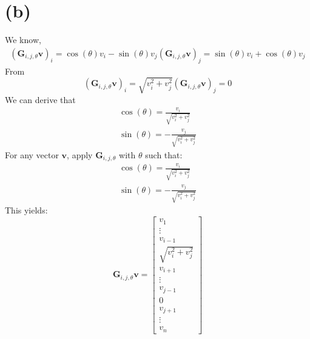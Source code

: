 \documentclass{article}
\begin{document}
\section*{(b)}
We know,
\begin{align*}
    (\bm{G}_{i,j,\theta} \bm{v})_i = \cos(\theta)v_i - \sin(\theta)v_j
    (\bm{G}_{i,j,\theta} \bm{v})_j = \sin(\theta)v_i + \cos(\theta)v_j
\end{align*}
From 
\[
    (\bm{G}_{i,j,\theta} \bm{v})_i = \sqrt{v_i^2 + v_j^2} 
    (\bm{G}_{i,j,\theta} \bm{v})_j = 0
\]
We can derive that
\begin{align*}
    \cos(\theta) = \frac{v_i}{\sqrt{v_i^2 + v_j^2}} \\
    \sin(\theta) = -\frac{v_j}{\sqrt{v_i^2 + v_j^2}}    
\end{align*}
For any vector \(\bm{v}\), apply \(\bm{G}_{i,j,\theta}\) with \(\theta\) such that:
\begin{align*}
    \cos(\theta) = \frac{v_i}{\sqrt{v_i^2 + v_j^2}} \\
    \sin(\theta) = -\frac{v_j}{\sqrt{v_i^2 + v_j^2}}
\end{align*}
This yields:
\[
    \bm{G}_{i,j,\theta}\bm{v} = \begin{bmatrix}
        v_1 \\
        \vdots \\
        v_{i-1} \\
        \sqrt{v_i^2 + v_j^2} \\
        v_{i+1} \\
        \vdots \\
        v_{j-1} \\
        0 \\
        v_{j+1} \\
        \vdots \\
        v_n
    \end{bmatrix}
\]
\end{document}
